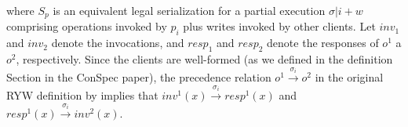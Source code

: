\documentclass[journal,compsoc]{IEEEtran}
\begin{document}
 where ${S_p}$ is an equivalent legal serialization  for a partial execution  $\sigma |i + w$ comprising
   operations invoked by $p_i$ plus writes invoked by other clients. %
 Let $\mathit{inv}_1$ and  $\mathit{inv}_2$ denote the invocations, and $\mathit{resp}_1$ and  $\mathit{resp}_2$ denote the responses  of  $\mathit{o}^1$ a $\mathit{o}^2$, respectively.  Since the clients are well-formed (as we defined in the definition Section in the ConSpec paper), %
 the precedence relation  $\mathit{o}^1 \xrightarrow{\sigma_i} \mathit{o}^2$ %
   in  the original RYW definition by  \cite{Chockler2000}  %
    implies that
   $ \mathit{inv}^1(x) \xrightarrow{\sigma_i} \mathit{resp}^1(x) $ and $ \mathit{resp}^1(x) \xrightarrow{\sigma_i} \mathit{inv}^2(x) $.
\end{document}
